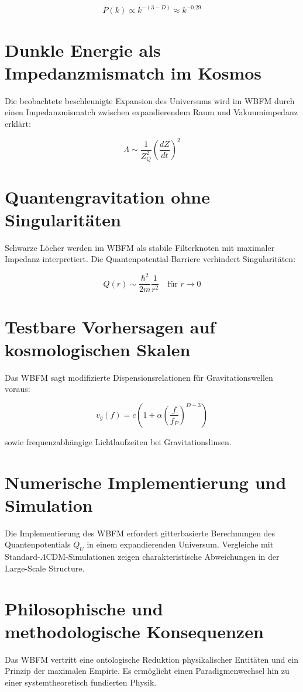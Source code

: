 \[
P(k) \propto k^{-(3-D)} \approx k^{-0.29}
\]

\section{Dunkle Energie als Impedanzmismatch im Kosmos}

Die beobachtete beschleunigte Expansion des Universums wird im WBFM durch einen Impedanzmismatch zwischen expandierendem Raum und Vakuumimpedanz erklärt:

\[
\Lambda \sim \frac{1}{Z_Q^2} \left( \frac{dZ}{dt} \right)^2
\]

\section{Quantengravitation ohne Singularitäten}

Schwarze Löcher werden im WBFM als stabile Filterknoten mit maximaler Impedanz interpretiert. Die Quantenpotential-Barriere verhindert Singularitäten:

\[
Q(r) \sim \frac{\hbar^2}{2m} \frac{1}{r^2} \quad \text{für } r \to 0
\]

\section{Testbare Vorhersagen auf kosmologischen Skalen}

Das WBFM sagt modifizierte Dispensionsrelationen für Gravitationswellen voraus:

\[
v_g(f) = c \left( 1 + \alpha \left( \frac{f}{f_P} \right)^{D-3} \right)
\]

sowie frequenzabhängige Lichtlaufzeiten bei Gravitationslinsen.

\section{Numerische Implementierung und Simulation}
Die Implementierung des WBFM erfordert gitterbasierte Berechnungen des Quantenpotentials $Q_U$ in einem expandierenden Universum. Vergleiche mit
Standard-$\Lambda$CDM-Simulationen zeigen charakteristische Abweichungen in der Large-Scale Structure.

\section{Philosophische und methodologische Konsequenzen}
Das WBFM vertritt eine ontologische Reduktion physikalischer Entitäten und ein Prinzip der maximalen Empirie. Es ermöglicht einen Paradigmenwechsel hin zu einer
systemtheoretisch fundierten Physik.

